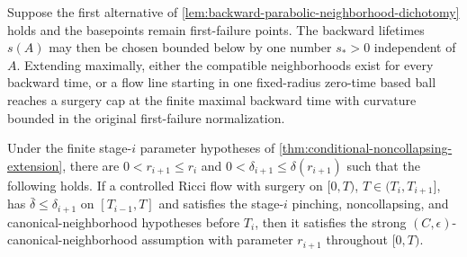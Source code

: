 \begin{lemma}
\label{lem:uniform-backward-lifetime}
\notready
Suppose the first alternative of
\ref{lem:backward-parabolic-neighborhood-dichotomy} holds and the basepoints
remain first-failure points.  The backward lifetimes $s(A)$ may then be
chosen bounded below by one number $s_*>0$ independent of $A$.  Extending
maximally, either the compatible neighborhoods exist for every backward
time, or a flow line starting in one fixed-radius zero-time based ball
reaches a surgery cap at the finite maximal backward time with curvature
bounded in the original first-failure normalization.
\end{lemma}

\begin{theorem}
\label{thm:strong-canonical-neighborhood-extension}
\notready
Under the finite stage-$i$ parameter hypotheses of
\ref{thm:conditional-noncollapsing-extension}, there are
$0<r_{i+1}\le r_i$ and
$0<\delta_{i+1}\le\delta(r_{i+1})$ such that the following holds.  If a
controlled Ricci flow with surgery on $[0,T)$,
$T\in(T_i,T_{i+1}]$, has $\bar\delta\le\delta_{i+1}$ on
$[T_{i-1},T]$ and satisfies the stage-$i$ pinching, noncollapsing, and
canonical-neighborhood hypotheses before $T_i$, then it satisfies the strong
$(C,\epsilon)$-canonical-neighborhood assumption with parameter
$r_{i+1}$ throughout $[0,T)$.
\end{theorem}

